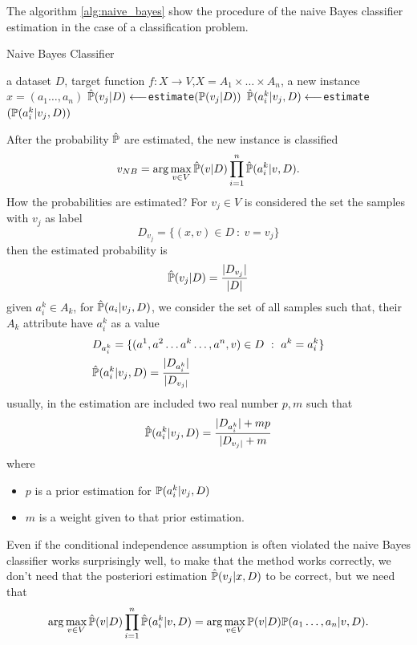 \documentclass[10pt, letterpaper]{report}
\begin{document}
The algorithm \ref{alg:naive_bayes} show the procedure of the naive Bayes classifier estimation in the case of a classification problem.\bigskip

\begin{algorithm}
    \caption{Naive Bayes Classifier}\label{alg:naive_bayes}
    \begin{algorithmic}
    \Require a dataset $D$, target function $f:X\rightarrow V$,$X=A_1\times \dots \times A_n$, a new instance $x=(a_1\dots,a_n)$
    \State $\hat {{\mathbb P}}(v_j|D)\longleftarrow$\texttt{estimate}$({\mathbb P}(v_j|D))$
    \State $\hat {{\mathbb P}}(a_i^k|v_j,D)\longleftarrow$\texttt{estimate}$({\mathbb P}(a_i^k|v_j,D))$
    \EndFor
    \EndFor
    \EndFor
    \end{algorithmic}
\end{algorithm}

After the probability $\hat{{\mathbb P}}$ are estimated, the new instance is classified\begin{equation}
    v_{NB}=\arg\max_{v\in V}\hat{{\mathbb P}}(v|D)\prod_{i=1}^{n}\hat{{\mathbb P}}(a_i^k|v,D).
\end{equation}
How the probabilities are estimated? For $v_j\in V$ is considered the set the samples with $v_j$ as label\begin{equation}
    D_{v_j}=\{(x,v)\in D \ : \ v=v_j\}
\end{equation}
then the estimated probability is \begin{equation}
    \hat{{\mathbb P}}(v_j|D)=\frac{|D_{v_j}|}{|D|}
\end{equation}
given $a_i^k\in A_k$, for $\hat {{\mathbb P}}(a_i|v_j,D)$, we consider the set of all samples such that, their $A_k$ attribute have $a_i^k$ as a value\begin{align}
    &D_{a_i^k}=\{(a^1,a^2\dots a^k \dots , a^n,v)\in D \ : \ a^k=a^k_i\}\\
    &\hat \Prob(a_i^k|v_j,D)=\frac{|D_{a_i^k}|}{|D_{v_j|}}
\end{align}
usually, in the estimation are included two real number $p,m$ such that\begin{equation}
    \hat {{\mathbb P}}(a_i^k|v_j,D)=\frac{|D_{a_i^k}|+mp}{|D_{v_j|}+m}
\end{equation}
where\begin{itemize}
    \item $p$ is a prior estimation for ${\mathbb P}(a_i^k|v_j,D)$
    \item $m$ is a weight given to that prior estimation.
\end{itemize}
Even if the conditional independence assumption is often violated the naive Bayes classifier works surprisingly well, to make that the method works correctly, we don't need that the posteriori estimation $\hat{{\mathbb P}}(v_j|x,D)$ to be correct, but we need that\begin{equation}
    \arg\max_{v\in V}\hat{{\mathbb P}}(v|D)\prod_{i=1}^{n}\hat{{\mathbb P}}(a_i^k|v,D)=\arg\max_{v\in V}{\mathbb P}(v|D){\mathbb P}(a_1\dots, a_n|v,D).
\end{equation}
\end{document}
